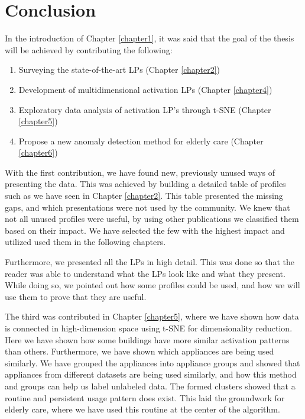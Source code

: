 \chapter{Conclusion}
\label{chapter7}

In the introduction of Chapter \ref{chapter1}, it was said that the goal of the thesis will be achieved by contributing the following:

\begin{enumerate}
	\item Surveying the state-of-the-art LPs (Chapter \ref{chapter2})
	\item Development of multidimensional activation LPs (Chapter \ref{chapter4})
	\item Exploratory data analysis of activation LP's through t-SNE (Chapter \ref{chapter5})
	\item Propose a new anomaly detection method for elderly care (Chapter \ref{chapter6})
\end{enumerate}

With the first contribution, we have found new, previously unused ways of presenting the data.
This was achieved by building a detailed table of profiles such as we have seen in Chapter \ref{chapter2}.
This table presented the missing gaps, and which presentations were not used by the community.
We knew that not all unused profiles were useful, by using other publications we classified them based on their impact. 
We have selected the few with the highest impact and utilized used them in the following chapters.

Furthermore, we presented all the LPs in high detail. This was done so that the reader was able to understand what the LPs look like and what they present.
While doing so, we pointed out how some profiles could be used, and how we will use them to prove that they are useful. 

The third was contributed in Chapter \ref{chapter5}, where we have shown how data is connected in high-dimension space
using t-SNE for dimensionality reduction. Here we have shown how some buildings have more similar activation patterns than others.
Furthermore, we have shown which appliances are being used similarly. 
We have grouped the appliances into appliance groups and showed that appliances from different datasets are being used similarly, and how this method and groups can help us label unlabeled data. 
The formed clusters showed that a routine and persistent usage pattern does exist. This laid the groundwork for elderly care, where we have used this routine at the center of the algorithm.

